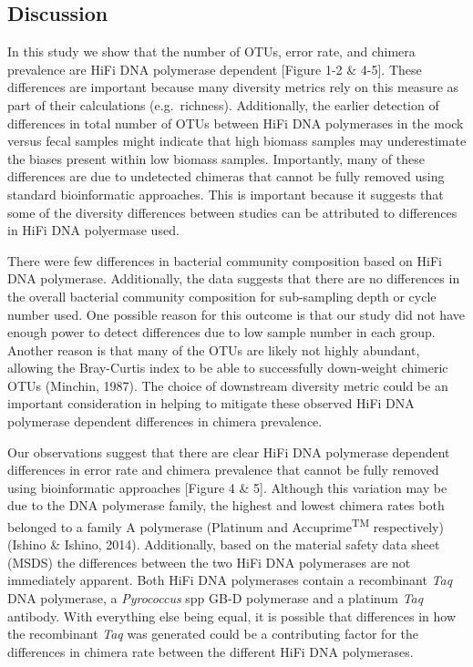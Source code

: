 \documentclass[12pt,]{article}
\begin{document}
\newpage

\subsection{Discussion}\label{discussion}

In this study we show that the number of OTUs, error rate, and chimera
prevalence are HiFi DNA polymerase dependent {[}Figure 1-2 \& 4-5{]}.
These differences are important because many diversity metrics rely on
this measure as part of their calculations (e.g.~richness).
Additionally, the earlier detection of differences in total number of
OTUs between HiFi DNA polymerases in the mock versus fecal samples might
indicate that high biomass samples may underestimate the biases present
within low biomass samples. Importantly, many of these differences are
due to undetected chimeras that cannot be fully removed using standard
bioinformatic approaches. This is important because it suggests that
some of the diversity differences between studies can be attributed to
differences in HiFi DNA polyermase used.

There were few differences in bacterial community composition based on
HiFi DNA polymerase. Additionally, the data suggests that there are no
differences in the overall bacterial community composition for
sub-sampling depth or cycle number used. One possible reason for this
outcome is that our study did not have enough power to detect
differences due to low sample number in each group. Another reason is
that many of the OTUs are likely not highly abundant, allowing the
Bray-Curtis index to be able to successfully down-weight chimeric OTUs
(Minchin, 1987). The choice of downstream diversity metric could be an
important consideration in helping to mitigate these observed HiFi DNA
polymerase dependent differences in chimera prevalence.

Our observations suggest that there are clear HiFi DNA polymerase
dependent differences in error rate and chimera prevalence that cannot
be fully removed using bioinformatic approaches {[}Figure 4 \& 5{]}.
Although this variation may be due to the DNA polymerase family, the
highest and lowest chimera rates both belonged to a family A polymerase
(Platinum and Accuprime\textsuperscript{TM} respectively) (Ishino \&
Ishino, 2014). Additionally, based on the material safety data sheet
(MSDS) the differences between the two HiFi DNA polymerases are not
immediately apparent. Both HiFi DNA polymerases contain a recombinant
\emph{Taq} DNA polymerase, a \emph{Pyrococcus} spp GB-D polymerase and a
platinum \emph{Taq} antibody. With everything else being equal, it is
possible that differences in how the recombinant \emph{Taq} was
generated could be a contributing factor for the differences in chimera
rate between the different HiFi DNA polymerases.
\end{document}

